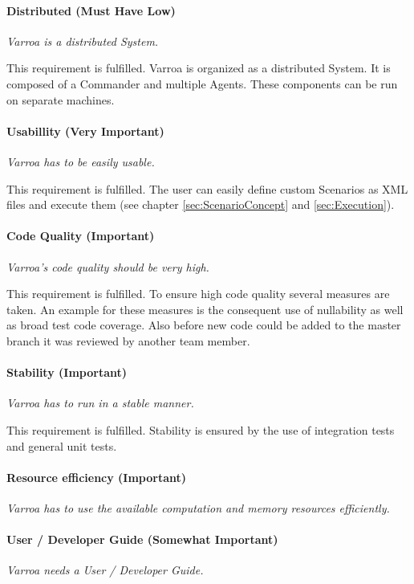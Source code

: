 \paragraph{Distributed (Must Have Low)} 
\emph{Varroa is a distributed System.}

This requirement is fulfilled.
Varroa is organized as a distributed System.
It is composed of a Commander and multiple Agents.
These components can be run on separate machines. 
 
\paragraph{Usabillity (Very Important)} 
\emph{Varroa has to be easily usable.}

This requirement is fulfilled.
The user can easily define custom Scenarios as XML files and execute them (see chapter \ref{sec:ScenarioConcept} and \ref{sec:Execution}).

\paragraph{Code Quality (Important)} 
\emph{Varroa's code quality should be very high.}

This requirement is fulfilled.
To ensure high code quality several measures are taken.
An example for these measures is the consequent use of nullability as well as broad test code coverage. 
Also before new code could be added to the master branch it was reviewed by another team member.

\paragraph{Stability (Important)} 
\emph{Varroa has to run in a stable manner.}

This requirement is fulfilled.
Stability is ensured by the use of integration tests and general unit tests.

\paragraph{Resource efficiency (Important)} 
\emph{Varroa has to use the available computation and memory resources efficiently.}

\paragraph{User / Developer Guide (Somewhat Important)} 
\emph{Varroa needs a User / Developer Guide.}

